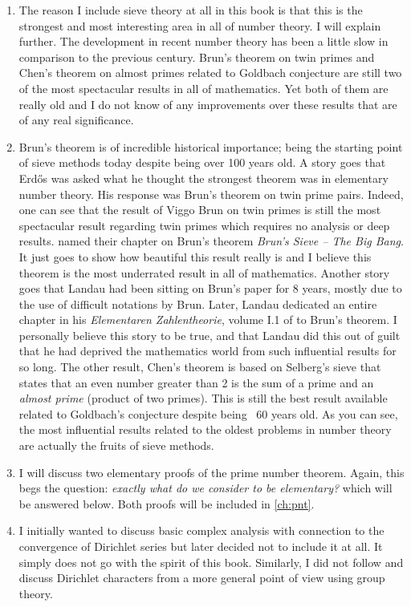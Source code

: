 \documentclass[12pt,leqno]{book}
\theoremstyle{definition}
\begin{document}
\begin{enumerate}[(1)]
			\item The reason I include sieve theory at all in this book is that this is the strongest and most interesting area in all of number theory. I will explain further. The development in recent number theory has been a little slow in comparison to the previous century. Brun's theorem on twin primes and Chen's theorem on almost primes related to Goldbach conjecture are still two of the most spectacular results in all of mathematics. Yet both of them are really old and I do not know of any improvements over these results that are of any real significance. \item Brun's theorem is of incredible historical importance; being the starting point of sieve methods today despite being over 100 years old. A story goes that Erd\H{o}s was asked what he thought the strongest theorem was in elementary number theory. His response was Brun's theorem on twin prime pairs. Indeed, one can see that the result of Viggo Brun on twin primes is still the most spectacular result regarding twin primes which requires no analysis or deep results. \textcite[Chapter VI]{friedlander_iwaniec_2010} named their chapter on Brun's theorem \textit{Brun’s Sieve – The Big Bang}. It just goes to show how beautiful this result really is and I believe this theorem is the most underrated result in all of mathematics. Another story goes that Landau had been sitting on Brun's paper for 8 years, mostly due to the use of difficult notations by Brun. Later, Landau dedicated an entire chapter in his \textit{Elementaren Zahlentheorie}, volume I.1 of \textcite{landau_1927} to Brun's theorem. I personally believe this story to be true, and that Landau did this out of guilt that he had deprived the mathematics world from such influential results for so long. The other result, Chen's theorem is based on Selberg's sieve that states that an even number greater than 2 is the sum of a prime and an \textit{almost prime} (product of two primes). This is still the best result available related to Goldbach's conjecture despite being ~60 years old. As you can see, the most influential results related to the oldest problems in number theory are actually the fruits of sieve methods.
			\item I will discuss two elementary proofs of the prime number theorem. Again, this begs the question: \textit{exactly what do we consider to be elementary?} which will be answered below. Both proofs will be included in \autoref{ch:pnt}.
			\item I initially wanted to discuss basic complex analysis with connection to the convergence of Dirichlet series but later decided not to include it at all. It simply does not go with the spirit of this book. Similarly, I did not follow \textcite{apostol_1976} and discuss Dirichlet characters from a more general point of view using group theory.

\end{enumerate}
\end{document}
